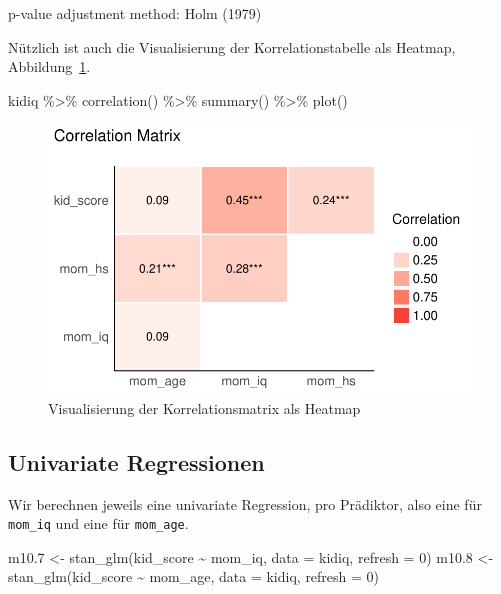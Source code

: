 \documentclass[
  a4paper,
  DIV=11]{scrreprt}
\newenvironment{Shaded}{\begin{snugshade}}{\end{snugshade}}
\newcommand{\AttributeTok}[1]{\textcolor[rgb]{0.40,0.45,0.13}{#1}}
\newcommand{\DecValTok}[1]{\textcolor[rgb]{0.68,0.00,0.00}{#1}}
\newcommand{\FloatTok}[1]{\textcolor[rgb]{0.68,0.00,0.00}{#1}}
\newcommand{\FunctionTok}[1]{\textcolor[rgb]{0.28,0.35,0.67}{#1}}
\newcommand{\NormalTok}[1]{\textcolor[rgb]{0.00,0.23,0.31}{#1}}
\newcommand{\OtherTok}[1]{\textcolor[rgb]{0.00,0.23,0.31}{#1}}
\newcommand{\SpecialCharTok}[1]{\textcolor[rgb]{0.37,0.37,0.37}{#1}}
\theoremstyle{definition}
\theoremstyle{remark}
\begin{document}
p-value adjustment method: Holm (1979)

Nützlich ist auch die Visualisierung der Korrelationstabelle als
Heatmap, Abbildung~\ref{fig-kidiq-heatmap}.

\begin{Shaded}
\begin{Highlighting}[]
\NormalTok{kidiq }\SpecialCharTok{\%\textgreater{}\%} 
  \FunctionTok{correlation}\NormalTok{() }\SpecialCharTok{\%\textgreater{}\%} 
  \FunctionTok{summary}\NormalTok{() }\SpecialCharTok{\%\textgreater{}\%} 
  \FunctionTok{plot}\NormalTok{()}
\end{Highlighting}
\end{Shaded}

\begin{figure}[H]

{\centering \includegraphics{./metrische-AV_files/figure-pdf/fig-kidiq-heatmap-1.pdf}

}

\caption{\label{fig-kidiq-heatmap}Visualisierung der Korrelationsmatrix
als Heatmap}

\end{figure}

\hypertarget{univariate-regressionen}{%
\subsection{Univariate Regressionen}\label{univariate-regressionen}}

Wir berechnen jeweils eine univariate Regression, pro Prädiktor, also
eine für \texttt{mom\_iq} und eine für \texttt{mom\_age}.

\begin{Shaded}
\begin{Highlighting}[]
\NormalTok{m10}\FloatTok{.7} \OtherTok{\textless{}{-}} \FunctionTok{stan\_glm}\NormalTok{(kid\_score }\SpecialCharTok{\textasciitilde{}}\NormalTok{ mom\_iq, }\AttributeTok{data =}\NormalTok{ kidiq, }\AttributeTok{refresh =} \DecValTok{0}\NormalTok{)}
\NormalTok{m10}\FloatTok{.8} \OtherTok{\textless{}{-}} \FunctionTok{stan\_glm}\NormalTok{(kid\_score }\SpecialCharTok{\textasciitilde{}}\NormalTok{ mom\_age, }\AttributeTok{data =}\NormalTok{ kidiq, }\AttributeTok{refresh =} \DecValTok{0}\NormalTok{)}
\end{Highlighting}
\end{Shaded}
\end{document}
